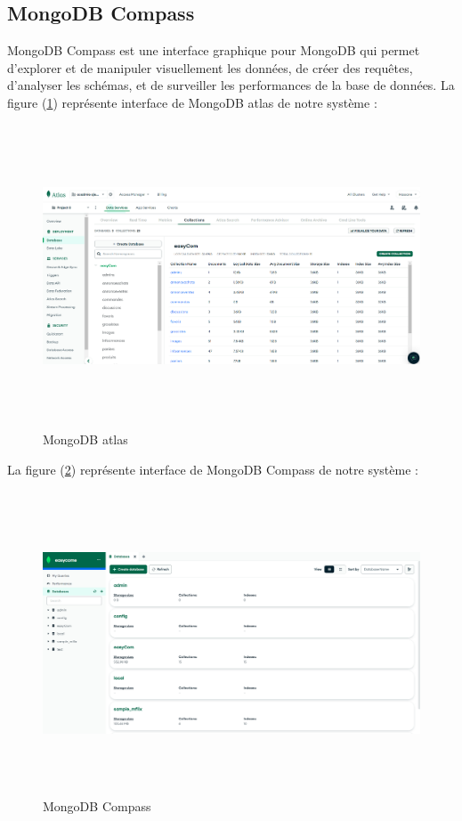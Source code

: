 \documentclass[edit,12pt,a4paper,ChapStyle,oneside,doubleinterligne]{report}
\begin{document}
\subsection{MongoDB Compass }
MongoDB Compass est une interface graphique pour MongoDB qui permet d'explorer et de manipuler visuellement les données, de créer des requêtes, d'analyser les schémas, et de surveiller les performances de la base de données.
\newline \phantom{hassane} \newline
La figure (\ref{fig:stock}) représente interface de MongoDB atlas de notre système :
\begin{figure} [H]
    \centering
    \includegraphics[width=15.742708333cm , height = 9cm , angle=360]{images/monogatlas.png}
    \caption{MongoDB atlas}
    \label{fig:stock}
\end{figure}
La figure (\ref{fig:compass}) représente interface de MongoDB Compass de notre système :
\begin{figure} [H]
    \centering
    \includegraphics[width=15.742708333cm , height = 9cm , angle=360]{images/mongodb db.png}
    \caption{MongoDB Compass}
    \label{fig:compass}
\end{figure}
\end{document}
